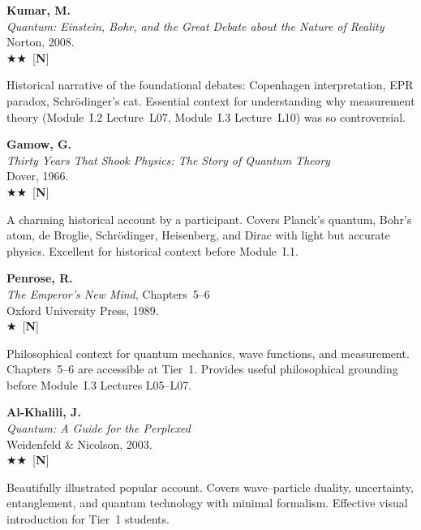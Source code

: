 \documentclass[11pt,a4paper]{article}
\newcommand{\recommended}{$\bigstar\bigstar$}
\newcommand{\useful}{$\bigstar$}
\newenvironment{bibentry}[1]{\begin{tcolorbox}[entrybox=#1,top=4pt,bottom=4pt]}{\end{tcolorbox}\smallskip}
\begin{document}
\begin{bibentry}{t1light}
\textbf{Kumar, M.}\\
\textit{Quantum: Einstein, Bohr, and the Great Debate about the Nature of Reality}\\
Norton, 2008.\\[3pt]
\recommended\ [\textbf{N}]\\[3pt]
\begin{tcolorbox}[annotbox]
Historical narrative of the foundational debates: Copenhagen interpretation,
EPR paradox, Schr\"odinger's cat. Essential context for understanding why
measurement theory (Module~I.2 Lecture~L07, Module~I.3 Lecture~L10) was so
controversial.
\end{tcolorbox}
\end{bibentry}

\begin{bibentry}{t1light}
\textbf{Gamow, G.}\\
\textit{Thirty Years That Shook Physics: The Story of Quantum Theory}\\
Dover, 1966.\\[3pt]
\recommended\ [\textbf{N}]\\[3pt]
\begin{tcolorbox}[annotbox]
A charming historical account by a participant. Covers Planck's quantum,
Bohr's atom, de Broglie, Schr\"odinger, Heisenberg, and Dirac with light
but accurate physics. Excellent for historical context before Module~I.1.
\end{tcolorbox}
\end{bibentry}

\begin{bibentry}{t1light}
\textbf{Penrose, R.}\\
\textit{The Emperor's New Mind}, Chapters~5--6\\
Oxford University Press, 1989.\\[3pt]
\useful\ [\textbf{N}]\\[3pt]
\begin{tcolorbox}[annotbox]
Philosophical context for quantum mechanics, wave functions, and measurement.
Chapters~5--6 are accessible at Tier~1. Provides useful philosophical grounding
before Module~I.3 Lectures L05--L07.
\end{tcolorbox}
\end{bibentry}

\begin{bibentry}{t1light}
\textbf{Al-Khalili, J.}\\
\textit{Quantum: A Guide for the Perplexed}\\
Weidenfeld \& Nicolson, 2003.\\[3pt]
\recommended\ [\textbf{N}]\\[3pt]
\begin{tcolorbox}[annotbox]
Beautifully illustrated popular account. Covers wave--particle duality, uncertainty,
entanglement, and quantum technology with minimal formalism. Effective visual
introduction for Tier~1 students.
\end{tcolorbox}
\end{bibentry}
\end{document}
